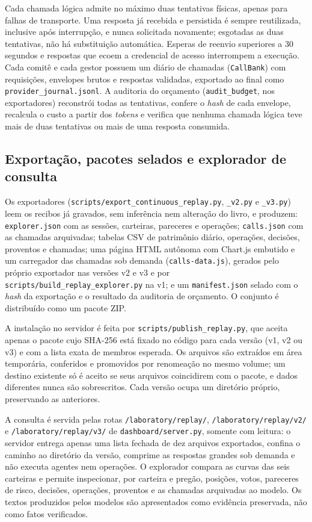 Cada chamada lógica admite no máximo duas tentativas físicas, apenas para falhas de transporte. Uma resposta já recebida e persistida é sempre reutilizada, inclusive após interrupção, e nunca solicitada novamente; esgotadas as duas tentativas, não há substituição automática. Esperas de reenvio superiores a 30 segundos e respostas que ecoem a credencial de acesso interrompem a execução. Cada comitê e cada gestor possuem um diário de chamadas (\texttt{CallBank}) com requisições, envelopes brutos e respostas validadas, exportado ao final como \texttt{provider\_journal.jsonl}. A auditoria do orçamento (\texttt{audit\_budget}, nos exportadores) reconstrói todas as tentativas, confere o \textit{hash} de cada envelope, recalcula o custo a partir dos \textit{tokens} e verifica que nenhuma chamada lógica teve mais de duas tentativas ou mais de uma resposta consumida.

\subsection{Exportação, pacotes selados e explorador de consulta}

Os exportadores (\texttt{scripts/export\_continuous\_replay.py}, \texttt{\_v2.py} e \texttt{\_v3.py}) leem os recibos já gravados, sem inferência nem alteração do livro, e produzem: \texttt{explorer.json} com as sessões, carteiras, pareceres e operações; \texttt{calls.json} com as chamadas arquivadas; tabelas CSV de patrimônio diário, operações, decisões, proventos e chamadas; uma página HTML autônoma com Chart.js embutido e um carregador das chamadas sob demanda (\texttt{calls-data.js}), gerados pelo próprio exportador nas versões v2 e v3 e por \texttt{scripts/build\_replay\_explorer.py} na v1; e um \texttt{manifest.json} selado com o \textit{hash} da exportação e o resultado da auditoria de orçamento. O conjunto é distribuído como um pacote ZIP.

A instalação no servidor é feita por \texttt{scripts/publish\_replay.py}, que aceita apenas o pacote cujo SHA-256 está fixado no código para cada versão (v1, v2 ou v3) e com a lista exata de membros esperada. Os arquivos são extraídos em área temporária, conferidos e promovidos por renomeação no mesmo volume; um destino existente só é aceito se seus arquivos coincidirem com o pacote, e dados diferentes nunca são sobrescritos. Cada versão ocupa um diretório próprio, preservando as anteriores.

A consulta é servida pelas rotas \texttt{/laboratory/replay/}, \texttt{/laboratory/replay/v2/} e \texttt{/laboratory/replay/v3/} de \texttt{dashboard/server.py}, somente com leitura: o servidor entrega apenas uma lista fechada de dez arquivos exportados, confina o caminho ao diretório da versão, comprime as respostas grandes sob demanda e não executa agentes nem operações. O explorador compara as curvas das seis carteiras e permite inspecionar, por carteira e pregão, posições, votos, pareceres de risco, decisões, operações, proventos e as chamadas arquivadas ao modelo. Os textos produzidos pelos modelos são apresentados como evidência preservada, não como fatos verificados.


